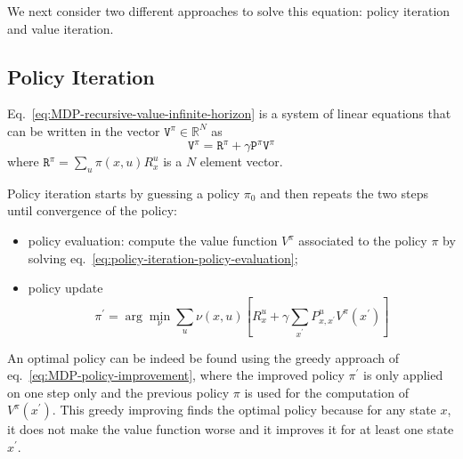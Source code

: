 We next consider two different approaches to solve this equation: policy iteration and value iteration.

\subsection{Policy Iteration}
\label{sec:MDP-policy-iteration}

Eq.~\eqref{eq:MDP-recursive-value-infinite-horizon} is a system of linear equations that can be written in the vector $\mathtt{V}^\pi\in\mathbb{R}^N$ as
\begin{equation}
  \label{eq:policy-iteration-policy-evaluation}
  \mathtt{V}^\pi = \mathtt{R}^\pi + \gamma \mathtt{P}^\pi \mathtt{V}^\pi
\end{equation}
where $\mathtt{R}^\pi = \sum_u \pi(x,u)R_x^u$ is a $N$ element vector.

Policy iteration starts by guessing a policy $\pi_0$ and then repeats the two steps until convergence of the policy:
\begin{itemize}
\item policy evaluation: compute the value function $V^\pi$ associated to the policy $\pi$ by solving eq.~\eqref{eq:policy-iteration-policy-evaluation};
\item policy update
  \begin{equation}
    \label{eq:MDP-policy-improvement}
    \pi^\prime = \arg \min_\nu \sum_u \nu(x,u)\left[R^u_x + \gamma \sum_{x^\prime}P^u_{x,x^\prime} V^\pi(x^\prime)\right]
  \end{equation}
\end{itemize}
An optimal policy can be indeed be found using the greedy approach of eq.~\eqref{eq:MDP-policy-improvement}, where the improved policy $\pi^\prime$ is only applied on one step only and the previous policy $\pi$ is used for the computation of $V^\pi(x^\prime)$. This greedy improving finds the optimal policy because for any state $x$, it does not make the value function worse and it improves it for at least one state $x^\prime$.

